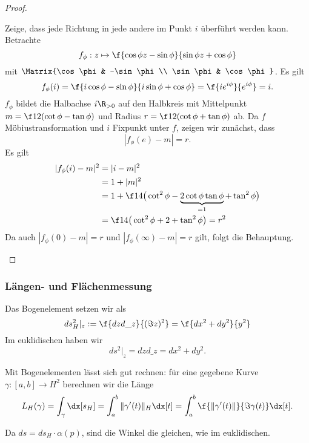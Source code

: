 \begin{st}
\begin{proof}
\begin{enumerate}[1)]
				Zeige, dass jede Richtung in jede andere im Punkt $i$ überführt werden kann.
				Betrachte
				\[
					f_\phi : z \mapsto \f{\cos \phi z - \sin \phi}{\sin \phi z + \cos \phi}
				\]
				mit $\Matrix{\cos \phi & -\sin \phi \\ \sin \phi & \cos \phi}$.
				Es gilt
				\[
					f_\phi(i)
					= \f{i \cos \phi - \sin \phi}{i \sin \phi + \cos \phi}
					= \f {i e^{i\phi}}{e^{i \phi}}
					= i.
				\]
				$f_\phi$ bildet die Halbachse $i \R_{> 0}$ auf den Halbkreis mit Mittelpunkt $m = \f 12 (\cot \phi - \tan \phi)$ und Radius $r = \f 12 (\cot \phi + \tan \phi)$ ab.
				Da $f$ Möbiustransformation und $i$ Fixpunkt unter $f$, zeigen wir zunächst, dass
				\[
					|f_\phi(e) - m | = r.
				\]
				Es gilt
				\begin{align*}
					|f_\phi(i) - m|^2
					&= |i - m|^2 \\
					&= 1 + |m|^2 \\
					&= 1 + \f 14 \big( \cot^2 \phi - \underbrace{2 \cot\phi \tan \phi}_{=1} + \tan^2 \phi \big) \\
					&= \f 14 \big( \cot^2 \phi + 2 + \tan^2 \phi \big)
					= r^2
				\end{align*}
				Da auch $|f_\phi(0) - m| = r$ und $|f_\phi(\infty) - m| = r$ gilt, folgt die Behauptung.
		\end{enumerate}
	\end{proof}
\end{st}

\subsubsection{Längen- und Flächenmessung}

Das Bogenelement setzen wir als
\[
	d s_H^2 |_z
	:= \f{dz d\_z}{(\Im z)^2}
	= \f{dx^2 + dy^2}{y^2}
\]
Im euklidischen haben wir
\[
	ds^2 |_z
	= dz d\_z
	= dx^2 + dy^2.
\]

Mit Bogenelementen lässt sich gut rechnen:
für eine gegebene Kurve $\gamma: [a,b] \to H^2$ berechnen wir die Länge
\[
	L_H(\gamma)
	= \int_\gamma \dx[s_H]
	= \int_a^b \|\gamma'(t)\|_H \dx[t]
	= \int_a^b \f{\|\gamma'(t)\|}{\Im \gamma(t)} \dx[t].
\]

Da $ds = ds_H \cdot \alpha(p)$, sind die Winkel die gleichen, wie im euklidischen.

